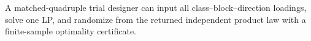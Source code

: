 A matched-quadruple trial designer can input all class--block--direction loadings, solve one LP, and randomize from the returned independent product law with a finite-sample optimality certificate.